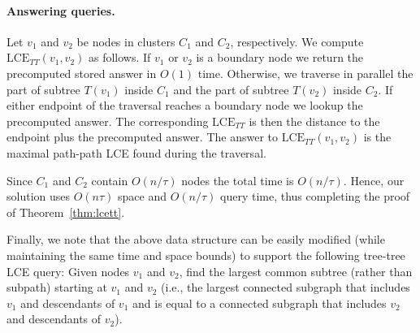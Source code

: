 \documentclass [10pt]{article}
\newcommand{\LCETT}{\ensuremath{\mathrm{LCE}_{\mathit{TT}}}}
\begin{document}
\paragraph{Answering queries.}
Let $v_1$ and $v_2$ be nodes in clusters $C_1$ and $C_2$, respectively. We compute  $\LCETT(v_1, v_2)$ as follows. If $v_1$ or $v_2$ is a boundary node we return the precomputed stored answer in $O(1)$ time. Otherwise, we traverse  in parallel the part of subtree $T(v_1)$ inside $C_1$ and the part of subtree $T(v_2)$ inside $C_2$. If either endpoint of the traversal reaches a boundary node we lookup the precomputed answer. The corresponding $\LCETT$ is then the distance to the endpoint plus the precomputed answer. The answer to $\LCETT(v_1, v_2)$ is the maximal path-path LCE found during the traversal.

Since $C_1$ and $C_2$ contain $O(n/\tau)$ nodes the total time is $O(n/\tau)$. Hence, our solution uses $O(n\tau)$ space and $O(n/\tau)$ query time, thus completing the proof of Theorem~\ref{thm:lcett}.

\medskip 

\noindent Finally, we note that the above data structure can be easily modified (while maintaining the same time and space bounds) to support the following tree-tree LCE query:
Given nodes $v_1$ and $v_2$, find the largest common subtree (rather than subpath) starting at $v_1$ and $v_2$ (i.e., the largest connected subgraph that includes $v_1$ and  descendants of $v_1$ and is equal to a connected subgraph that includes $v_2$ and  descendants of $v_2$).



\end{document}
